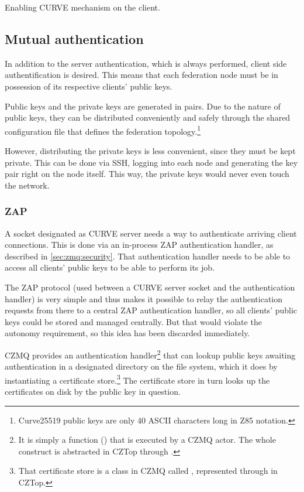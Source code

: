 \begin{listing}
	\inputminted[bgcolor=bg]{Ruby}{listings/auth/fednf.rb}
	\caption{Enabling CURVE mechanism on the client.}
	\label{lst:auth:fednf}
\end{listing}

\subsection{Mutual authentication}
In addition to the server authentication, which is always performed, client
side authentification is desired. This means that each federation node must be
in possession of its respective clients' public keys.

Public keys and the private keys are generated in pairs.  Due to
the nature of public keys, they can be distributed conveniently and safely
through the shared configuration file that defines the federation
topology.\footnote{Curve25519 public keys are only 40 ASCII characters long in
\gls{Z85} notation.}

However, distributing the private keys is less convenient, since they must be kept
private. This can be done via \gls{SSH}, logging into each node and generating
the key pair right on the node itself. This way, the private keys would never
even touch the network.

\subsubsection{ZAP}
A socket designated as CURVE server needs a way to authenticate arriving client
connections. This is done via an in-process \gls{ZAP} authentication handler,
as described in \autoref{sec:zmq:security}. That authentication handler
needs to be able to access all clients' public keys to be able to perform its
job.

The ZAP protocol (used between a CURVE server socket and the authentication
handler) is very simple and thus makes it possible to relay the authentication
requests from there to a central ZAP authentication handler, so all clients'
public keys could be stored and managed centrally. But that would violate the
autonomy requirement, so this idea has been discarded immediately.

CZMQ provides an authentication handler\footnote{It is simply a function
() that is executed by a CZMQ actor. The whole construct is
abstracted in CZTop through .} that can lookup public
keys awaiting authentication in a designated directory on the file system,
which it does by instantiating a certificate store.\footnote{That certificate
store is a class in CZMQ called , represented through
 in CZTop.} The certificate store in turn looks up the
certificates on disk by the public key in question.

